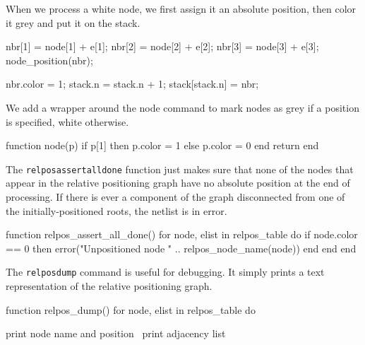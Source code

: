 When we process a white node, we first assign it an absolute position,
then color it grey and put it on the stack.

\nwenddocs{}\endmoddef
nbr[1] = node[1] + e[1];
nbr[2] = node[2] + e[2];
nbr[3] = node[3] + e[3];
node_position(nbr);

nbr.color = 1;
stack.n = stack.n + 1;
stack[stack.n] = nbr;
\nwendcode{}\nwdocspar

We add a wrapper around the node command to mark nodes as 
grey if a position is specified, white otherwise.

\nwenddocs{}\plusendmoddef
function node(p)
  if p[1] then
    p.color = 1
  else
    p.color = 0
  end
  return %
end

\nwendcode{}\nwdocspar

The {\tt{}relpos{}assert{}all{}done} function just makes sure that
none of the nodes that appear in the relative positioning graph
have no absolute position at the end of processing.  If there
is ever a component of the graph disconnected from one of the
initially-positioned roots, the netlist is in error.

\nwenddocs{}\plusendmoddef
function relpos_assert_all_done()
  for node, elist in relpos_table do
    if node.color == 0 then
      error("Unpositioned node " .. relpos_node_name(node))
    end
  end
end

\nwendcode{}\nwdocspar

The {\tt{}relpos{}dump} command is useful for debugging.  It simply
prints a text representation of the relative positioning graph.

\nwenddocs{}\plusendmoddef
function relpos_dump()
  for node, elist in relpos_table do

    \LA{}print node name and position~{\nwtagstyle{}}\RA{}
    \LA{}print adjacency list~{\nwtagstyle{}}\RA{}

